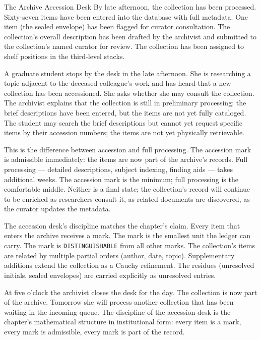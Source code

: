 \begin{coda}{The Archive Accession Desk}
By late afternoon, the collection has been processed. Sixty-seven items
have been entered into the database with full metadata. One item (the
sealed envelope) has been flagged for curator consultation. The collection's
overall description has been drafted by the archivist and submitted to the
collection's named curator for review. The collection has been assigned to
shelf positions in the third-level stacks.

A graduate student stops by the desk in the late afternoon. She is
researching a topic adjacent to the deceased colleague's work and has heard
that a new collection has been accessioned. She asks whether she may
consult the collection. The archivist explains that the collection is
still in preliminary processing; the brief descriptions have been entered,
but the items are not yet fully cataloged. The student may search the brief
descriptions but cannot yet request specific items by their accession
numbers; the items are not yet physically retrievable.

This is the difference between accession and full processing. The accession
mark is admissible immediately: the items are now part of the archive's
records. Full processing --- detailed descriptions, subject indexing,
finding aids --- takes additional weeks. The accession mark is the minimum;
full processing is the comfortable middle. Neither is a final state; the
collection's record will continue to be enriched as researchers consult it,
as related documents are discovered, as the curator updates the metadata.

The accession desk's discipline matches the chapter's claim. Every item
that enters the archive receives a mark. The mark is the smallest unit the
ledger can carry. The mark is \texttt{DISTINGUISHABLE} from all other marks.
The collection's items are related by multiple partial orders (author, date,
topic). Supplementary additions extend the collection as a Cauchy
refinement. The residues (unresolved initials, sealed envelopes) are
carried explicitly as unresolved entries.

At five o'clock the archivist closes the desk for the day. The collection
is now part of the archive. Tomorrow she will process another collection
that has been waiting in the incoming queue. The discipline of the
accession desk is the chapter's mathematical structure in institutional
form: every item is a mark, every mark is admissible, every mark is part
of the record.

\end{coda}
